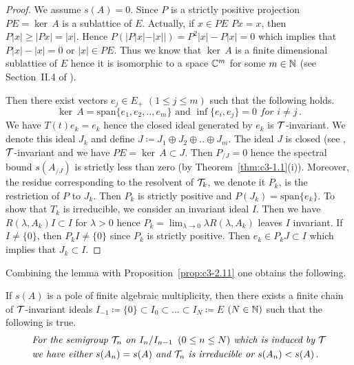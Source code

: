 \begin{proof}
	We assume $s(A) = 0$. 
	Since $P$ is a strictly positive projection $PE = \ker\,A$ is a sublattice of $E$. 
	Actually, if $x \in PE$ \ie  $Px = x$, then $P|x| \geq |Px| = |x|$. 
	Hence $P(|P|x|-|x||) = P^{2}|x| - P|x| = 0$ which implies that $P|x| - |x| = 0$ or $|x| \in PE$.
	Thus we know that $\ker\,A$ is a finite dimensional sublattice of $E$ hence it is isomorphic to a space $\mathbb{C} ^{m}$ for some $m \in \mathbb{N}$ (see Section~II.4 of \citet{schaefer:1974}). 
	
	Then there exist vectors $e_{j} \in E_{+}$ $(1\leq j\leq m)$ such that the following holds.
	\begin{equation}\label{eq:c3-3.18}
		\ker\,A = \mathrm{span} \{e_{1},e_{2}, .. ,e_{m}\} \text{ and } \inf\{e_{i},e_{j}\} = 0 \textit{ for }  i \neq j\,.
	\end{equation}
	We have $T(t)e_{k} = e_{k}$ hence the closed ideal generated by $e_{k}$ is $\mathcal{T}$-invariant. 
	We denote this ideal $J_{k}$ and define $J\coloneqq  J_{1}\oplus J_{2}\oplus .. \oplus J_{m}$.
	The ideal $J$ is closed 
    (see \citet[III Theorem~1.2]{schaefer:1974}, $\mathcal{T}$-invariant and we have $PE = \ker\,A \subset J$. 
	Then $P_{/J} = 0$ hence the spectral bound $s(A_{/J})$
%
	is strictly less than zero (by Theorem~\ref{thm:c3-1.1}(i)). 
	Moreover, the residue corresponding to the resolvent of $\mathcal{T}_{k}$, we denote it $P_{k}$, is the restriction of $P$ to $J_{k}$.
	Then $P_{k}$ is strictly positive and $P(J_{k}) = \mathrm{span}\{e_{k}\}$. 
	To show that $T_{k}$ is irreducible, we consider an invariant ideal $I$. 
	Then we have $R(\lambda,A_{k})I \subset I$ for $\lambda > 0$ hence $P_{k} = \lim_{\lambda \to 0}\lambda R(\lambda,A_{k})$ leaves $I$ invariant. 
	If $I \neq \{0\}$, then $P_{k}I \neq \{0\}$ since $P_{k}$ is strictly positive. 
	Then $e_{k} \in P_{k}J \subset I$ which implies that $J_{k} \subset I$.
\end{proof}

Combining the lemma with Proposition~\ref{prop:c3-2.11} one obtains the following.

If $s(A)$ is a pole of finite algebraic multiplicity, then there exists a finite chain of $\mathcal{T}$-invariant ideals $I_{-1} \coloneqq  \{0\} \subset I_{0}\subset ... \subset I_{N} \coloneqq  E$ $(N\in\mathbb{N})$ such that the following is true.
\begin{equation}\label{eq:c3-3.19}
	\begin{aligned}
	&\textit{For the semigroup $\mathcal{T}_{n}$ on $I_{n}/I_{n-1}\, \ (0 \leq n \leq N)$ which is induced by $\mathcal{T}$}
		\\
	& \textit{we have either $s(A_{n}) = s(A)$ and $\mathcal{T}_{n}$ is irreducible or $s(A_{n}) < s(A)$}\,.
	\end{aligned}
\end{equation}

